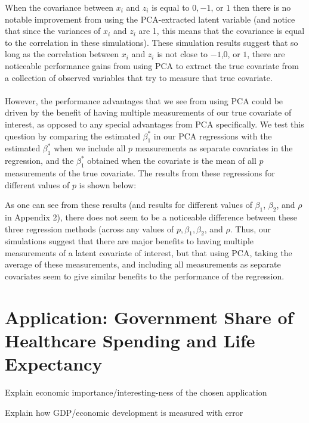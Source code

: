 \documentclass[12pt]{article}
\begin{document}


 When the covariance between $x_i$ and $z_i$ is equal to $0, -1$, or $1$ then there is no notable improvement from using the PCA-extracted latent variable (and notice that since the variances of $x_i$ and $z_i$ are 1, this means that the covariance is equal to the correlation in these simulations). These simulation results suggest that so long as the correlation between $x_i$ and $z_i$ is not close to $-1$,$0$, or $1$, there are noticeable performance gains from using PCA to extract the true covariate from a collection of observed variables that try to measure that true covariate.\\
\\
However, the performance advantages that we see from using PCA could be driven by the benefit of having multiple measurements of our true covariate of interest, as opposed to any special advantages from PCA specifically. We test this question by comparing the estimated $\beta_1^*$ in our PCA regressions with the estimated $\beta_1^*$ when we include all $p$ measurements as separate covariates in the regression, and the $\beta_1^*$ obtained when the covariate is the mean of all $p$ measurements of the true covariate. The results from these regressions for different values of $p$ is shown below:



As one can see from these results (and results for different values of $\beta_1$, $\beta_2$, and $\rho$ in Appendix 2), there does not seem to be a noticeable difference between these three regression methods (across any values of $p, \beta_1,\beta_2$, and $\rho$. Thus, our simulations suggest that there are major benefits to having multiple measurements of a latent covariate of interest, but that using PCA, taking the average of these measurements, and including all measurements as separate covariates seem to give similar benefits to the performance of the regression.


    \section*{Application: Government Share of Healthcare Spending and Life Expectancy}

        Explain economic importance/interesting-ness of the chosen application

        Explain how GDP/economic development is measured with error
\end{document}
